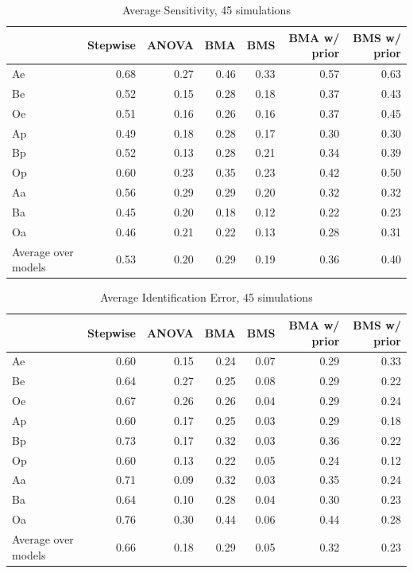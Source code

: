 \documentclass[]{article}
\begin{document}
\begin{table}[ht]
\centering
\caption{Average Sensitivity, 45 simulations}
\begin{tabular}{lrrrrrr}
 \hline
  & Stepwise & ANOVA & BMA & BMS & BMA w/ prior & BMS w/ prior \\ 
   \hline
 Ae & 0.68 & 0.27 & 0.46 & 0.33 & 0.57 & 0.63 \\ 
   Be & 0.52 & 0.15 & 0.28 & 0.18 & 0.37 & 0.43 \\ 
   Oe & 0.51 & 0.16 & 0.26 & 0.16 & 0.37 & 0.45 \\ 
   Ap & 0.49 & 0.18 & 0.28 & 0.17 & 0.30 & 0.30 \\ 
   Bp & 0.52 & 0.13 & 0.28 & 0.21 & 0.34 & 0.39 \\ 
   Op & 0.60 & 0.23 & 0.35 & 0.23 & 0.42 & 0.50 \\ 
   Aa & 0.56 & 0.29 & 0.29 & 0.20 & 0.32 & 0.32 \\ 
   Ba & 0.45 & 0.20 & 0.18 & 0.12 & 0.22 & 0.23 \\ 
   Oa & 0.46 & 0.21 & 0.22 & 0.13 & 0.28 & 0.31 \\ 
   \hline
    Average over models & 0.53 & 0.20 & 0.29 & 0.19 & 0.36 & 0.40 \\ 
    \hline
\end{tabular}
\end{table}

\begin{table}[ht]
\centering
\caption{Average Identification Error, 45 simulations}
\begin{tabular}{lrrrrrr}
\hline
 & Stepwise & ANOVA & BMA & BMS & BMA w/ prior & BMS w/ prior \\ 
\hline
Ae & 0.60 & 0.15 & 0.24 & 0.07 & 0.29 & 0.33 \\ 
  Be & 0.64 & 0.27 & 0.25 & 0.08 & 0.29 & 0.22 \\ 
  Oe & 0.67 & 0.26 & 0.26 & 0.04 & 0.29 & 0.24 \\ 
  Ap & 0.60 & 0.17 & 0.25 & 0.03 & 0.29 & 0.18 \\ 
  Bp & 0.73 & 0.17 & 0.32 & 0.03 & 0.36 & 0.22 \\ 
  Op & 0.60 & 0.13 & 0.22 & 0.05 & 0.24 & 0.12 \\ 
  Aa & 0.71 & 0.09 & 0.32 & 0.03 & 0.35 & 0.24 \\ 
  Ba & 0.64 & 0.10 & 0.28 & 0.04 & 0.30 & 0.23 \\ 
  Oa & 0.76 & 0.30 & 0.44 & 0.06 & 0.44 & 0.28 \\ 
  \hline
  Average over models & 0.66 & 0.18 & 0.29 & 0.05 & 0.32 & 0.23 \\ 
   \hline
\end{tabular}
\end{table}
\end{document}
